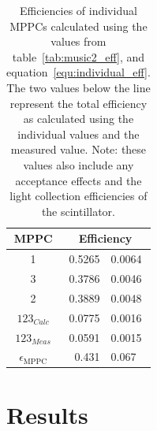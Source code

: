 \begin{table}
  \lineup
  \begin{center}
    \begin{tabular}{c|r@{~\(\pm\)~}l}
      MPPC  &  \multicolumn{2}{c}{Efficiency} \\
      \hline
      1  &  0.5265 & 0.0064  \\
      3  &  0.3786 & 0.0046  \\
      2  &  0.3889 & 0.0048  \\
      \hline
      \( 123_{Calc} \)  &  0.0775  &  0.0016  \\
      \( 123_{Meas} \)  &  0.0591  &  0.0015  \\
      \hline 
      \( \epsilon_{\text{MPPC}} \)  &  0.431\0 & 0.067 \\
         
    \end{tabular}
  \end{center}
  \caption{Efficiencies of individual MPPCs calculated using the values from table~\ref{tab:music2_eff}, and equation~\eqref{equ:individual_eff}. The two values below the line represent the total efficiency as calculated using the individual values and the measured value. Note: these values also include any acceptance effects and the light collection efficiencies of the scintillator.}
  \label{tab:calculated_individual_eff}
\end{table}


\section{Results} %
\label{sec:results}

